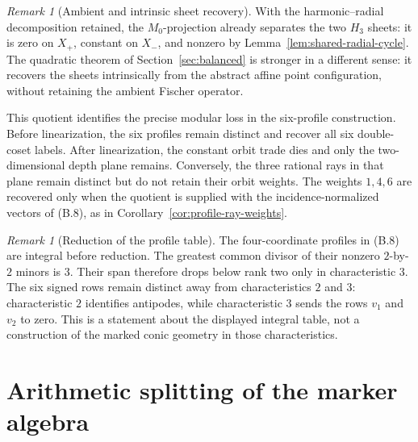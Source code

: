 \documentclass[11pt]{article}
\theoremstyle{definition}
\theoremstyle{remark}
\newtheorem{remark}[theorem]{Remark}
\begin{document}
\begin{remark}[Ambient and intrinsic sheet recovery]
With the harmonic--radial decomposition retained, the \(M_0\)-projection
already separates the two \(H_3\) sheets: it is zero on \(X_+\), constant
on \(X_-\), and nonzero by Lemma~\ref{lem:shared-radial-cycle}.  The quadratic theorem of
Section~\ref{sec:balanced} is stronger in a different sense: it recovers
the sheets intrinsically from the abstract affine point configuration,
without retaining the ambient Fischer operator.
\end{remark}

This quotient identifies the precise modular loss in the six-profile
construction.  Before linearization, the six profiles remain distinct
and recover all six double-coset labels.  After linearization, the
constant orbit trade dies and only the two-dimensional depth plane
remains.  Conversely, the three rational rays in that plane remain
distinct but do not retain their orbit weights.  The weights \(1,4,6\) are
recovered only when the quotient is supplied with the
incidence-normalized vectors of (B.8), as in
Corollary~\ref{cor:profile-ray-weights}.

\begin{remark}[Reduction of the profile table]
\label{rem:bad-profile-primes}
The four-coordinate profiles in (B.8) are integral before reduction.
The greatest common divisor of their nonzero $2$-by-$2$ minors is $3$.
Their span therefore drops below rank two only in characteristic $3$.
The six signed rows remain distinct away from characteristics $2$ and
$3$: characteristic $2$ identifies antipodes, while characteristic
$3$ sends the rows $v_1$ and $v_2$ to zero.  This is a statement about
the displayed integral table, not a construction of the marked conic
geometry in those characteristics.
\end{remark}

\section{Arithmetic splitting of the marker algebra}
\label{sec:arithmetic-splitting}
\end{document}
